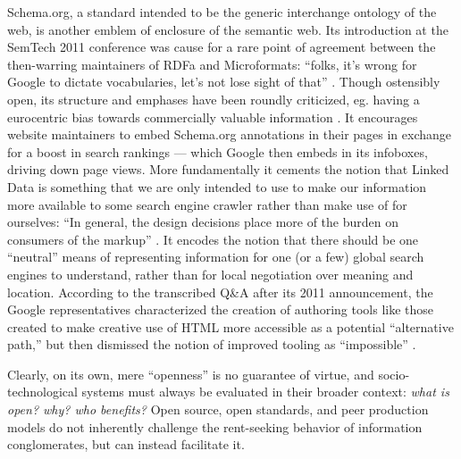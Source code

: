 Schema.org, a standard intended to be the generic interchange ontology
of the web, is another emblem of enclosure of the semantic web. Its
introduction at the SemTech 2011 conference was cause for a rare point
of agreement between the then-warring maintainers of RDFa and Microformats:
``folks, it's wrong for Google to dictate vocabularies, let's not lose
sight of that'' \cite{SemTech2011BOF2011} . Though ostensibly
open, its structure and emphases have been roundly criticized, eg.
having a eurocentric bias towards commercially valuable information \cite{iliadisOneSchemaRule2023} . It encourages website maintainers to
embed Schema.org annotations in their pages in exchange for a boost in
search rankings --- which Google then embeds in its infoboxes, driving
down page views. More fundamentally it cements the notion that Linked
Data is something that we are only intended to use to make our
information more available to some search engine crawler rather than
make use of for ourselves: ``In general, the design decisions place more
of the burden on consumers of the markup'' \cite{guhaSchemaOrgEvolution2015} . It encodes the notion that there should
be one ``neutral'' means of representing information for one (or a few)
global search engines to understand, rather than for local negotiation
over meaning and location. According to the transcribed Q\&A after its
2011 announcement, the Google representatives characterized the creation
of authoring tools like those created to make creative use of HTML more
accessible as a potential ``alternative path,'' but then dismissed the
notion of improved tooling as ``impossible'' \cite{hawkeNotesSessionSemTech2011} .

Clearly, on its own, mere ``openness'' is no guarantee of virtue, and
socio-technological systems must always be evaluated in their broader
context: \emph{what is open? why? who benefits?} Open source, open
standards, and peer production models do not inherently challenge the
rent-seeking behavior of information conglomerates, but can instead
facilitate it.

